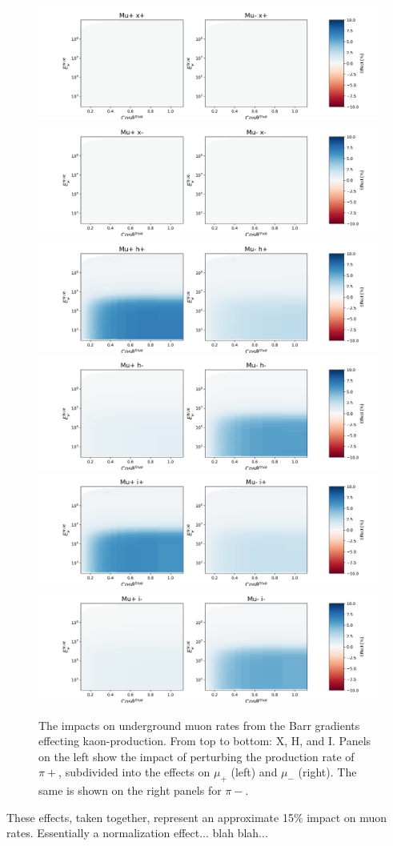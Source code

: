 \documentclass[main.tex]{subfiles}
\begin{document}
\begin{figure}
    \centering
    \includegraphics[width=0.45\linewidth]{./figures/muon/under_muon_barr_x+.png}%
    \includegraphics[width=0.45\linewidth]{./figures/muon/under_muon_barr_x-.png}
    \includegraphics[width=0.45\linewidth]{./figures/muon/under_muon_barr_h+.png}%
    \includegraphics[width=0.45\linewidth]{./figures/muon/under_muon_barr_h-.png}
    \includegraphics[width=0.45\linewidth]{./figures/muon/under_muon_barr_i+.png}%
    \includegraphics[width=0.45\linewidth]{./figures/muon/under_muon_barr_i-.png}
    \caption{The impacts on underground muon rates from the Barr gradients effecting kaon-production. From top to bottom: X, H, and I. Panels on the left show the impact of perturbing the production rate of $\pi+$, subdivided into the effects on $\mu_{+}$ (left) and $\mu_{-}$ (right). The same is shown on the right panels for $\pi-$.}\label{fig:under_barr_muon_pion}
\end{figure}

These effects, taken together, represent an approximate 15\% impact on muon rates. 
Essentially a normalization effect... blah blah... 
\end{document}

